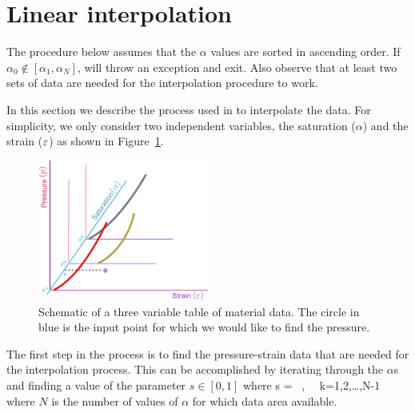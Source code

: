 \section{Linear interpolation}
\begin{NoteBox}
The procedure below assumes that the $\alpha$ values are sorted in ascending order.
If $\alpha_0 \notin [\alpha_1, \alpha_N]$, \Vaango will throw an exception and
exit.  Also observe that at least two sets of data are needed for the interpolation
procedure to work.
\end{NoteBox}

In this section we describe the process used in \Vaango to interpolate the data.
For simplicity, we only consider two independent variables, the saturation ($\alpha$)
and the strain ($\varepsilon$) as shown in Figure~\ref{fig:tabular_data_step1}.  
\begin{figure}[htbp!]
  \centering
  \includegraphics[width=0.5\textwidth]{Figs/tabular/table_interpolation_step1.pdf}
  \caption{Schematic of a three variable table of material data. The 
           circle in blue is the input point for which we would like to find the pressure.}
  \label{fig:tabular_data_step1}
\end{figure}

The first step in the process is to find the pressure-strain data that are needed 
for the interpolation process.  This can be accomplished by iterating through 
the $\alpha$s and finding a value of the parameter $s \in [0,1]$ where
\Beq
  s = ~,~~ k=1,2,\dots,N-1
\Eeq
where $N$ is the number of values of $\alpha$ for which data area available.


